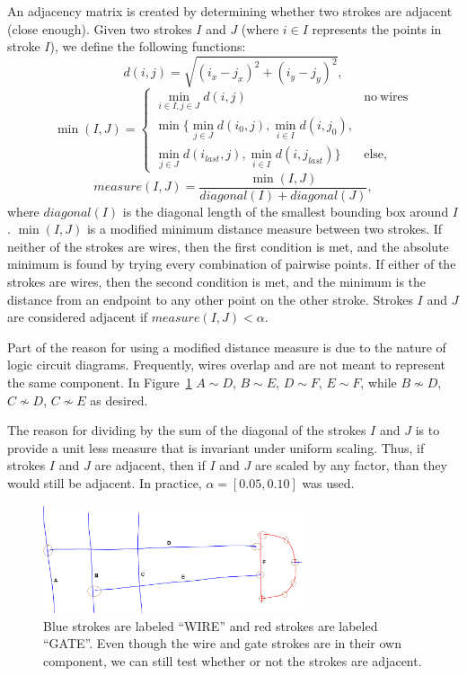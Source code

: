 \documentclass[10pt]{acmsiggraph}               %
\begin{document}
An adjacency matrix is created by determining whether two strokes are adjacent (close enough).
Given two strokes $I$ and $J$ (where $i \in I$ represents the points in stroke $I$), we define the following functions:
$$
d(i, j) = \sqrt{(i_x - j_x)^2 + (i_y - j_y)^2},
$$
\[
\min(I, J) = \left\{
\begin{matrix}
\min_{i \in I, j \in J} d(i, j) & \mathrm{no\ wires}\\
\min\{
	\min_{j \in J} d(i_0, j),
	\min_{i \in I} d(i, j_0),\\
	\min_{j \in J} d(i_{last}, j),
	\min_{i \in I} d(i, j_{last})
	\} & \mathrm{else,}
\end{matrix} \right.
\]
$$
measure(I, J) = \frac{\min(I, J)}{diagonal(I) + diagonal(J)},
$$
where $diagonal(I)$ is the diagonal length of the smallest bounding box around $I$.
$\min(I, J)$ is a modified minimum distance measure between two strokes.
If neither of the strokes are wires, then the first condition is met, and the absolute minimum is found by trying every combination of pairwise points.
If either of the strokes are wires, then the second condition is met, and the minimum is the distance from an endpoint to any other point on the other stroke.
Strokes $I$ and $J$ are considered adjacent if $measure(I, J) < \alpha$.

Part of the reason for using a modified distance measure is due to the nature of logic circuit diagrams.
Frequently, wires overlap and are not meant to represent the same component.
In Figure~\ref{fig:adjacencies} $A\sim D$, $B\sim E$, $D\sim F$, $E\sim F$, while $B\not \sim D$, $C\not \sim D$, $C\not \sim E$ as desired.

The reason for dividing by the sum of the diagonal of the strokes $I$ and $J$ is to provide a unit less measure that is invariant under uniform scaling.
Thus, if strokes $I$ and $J$ are adjacent, then if $I$ and $J$ are scaled by any factor, than they would still be adjacent.
In practice, $\alpha = [0.05, 0.10]$ was used.
 
\begin{figure}[h]
\centering
\includegraphics[width=3.0in]{adjacencies.png}%
\caption{Blue strokes are labeled ``WIRE'' and red strokes are labeled ``GATE''. 
Even though the wire and gate strokes are in their own component, we can still test whether or not the strokes are adjacent.}
\label{fig:adjacencies}
\end{figure}
\end{document}
